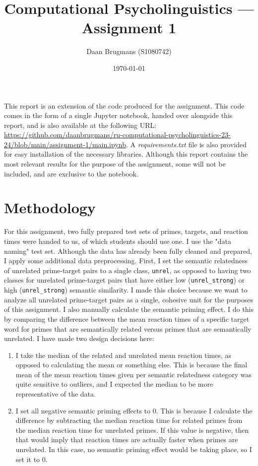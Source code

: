 \documentclass{IEEEtran}
\begin{document}
\title{Computational Psycholinguistics --- Assignment 1}
\author{Daan Brugmans (S1080742)}
\date{\today}

\maketitle

This report is an extension of the code produced for the assignment.
This code comes in the form of a single Jupyter notebook, handed over alongside this report, and is also available at the following URL: \url{https://github.com/daanbrugmans/ru-computational-psycholinguistics-23-24/blob/main/assignment-1/main.ipynb}.
A \textit{requirements.txt} file is also provided for easy installation of the necessary libraries.
Although this report contains the most relevant results for the purpose of the assignment, some will not be included, and are exclusive to the notebook.

\section{Methodology}
For this assignment, two fully prepared test sets of primes, targets, and reaction times were handed to us, of which students should use one.
I use the "data naming" test set.
Although the data has already been fully cleaned and prepared, I apply some additional data preprocessing.
First, I set the semantic relatedness of unrelated prime-target pairs to a single class, \texttt{unrel}, as opposed to having two classes for unrelated prime-target pairs that have either low (\texttt{unrel\_strong}) or high (\texttt{unrel\_strong}) semantic similarity.
I made this choice because we want to analyze all unrelated prime-target pairs as a single, cohesive unit for the purposes of this assignment.
I also manually calculate the semantic priming effect.
I do this by comparing the difference between the mean reaction times of a specific target word for primes that are semantically related versus primes that are semantically unrelated.
I have made two design decisions here:
\begin{enumerate}
    \item I take the median of the related and unrelated mean reaction times, as opposed to calculating the mean or something else.
    This is because the final mean of the mean reaction times given per semantic relatedness category was quite sensitive to outliers, and I expected the median to be more representative of the data.
    \item I set all negative semantic priming effects to 0.
    This is because I calculate the difference by subtracting the median reaction time for related primes from the median reaction time for unrelated primes.
    If this value is negative, then that would imply that reaction times are actually faster when primes are unrelated.
    In this case, no semantic priming effect would be taking place, so I set it to 0.
\end{enumerate}
\end{document}
